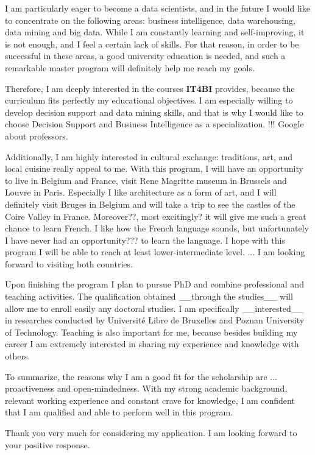 \documentclass[a4paper,14pt]{extarticle}
\begin{document}
I am particularly eager to become a data scientists, and in the future I would like to concentrate on the following areas: business intelligence, data warehousing, data mining and big data. While I am constantly learning and self-improving, it is not enough, and I feel a certain lack of skills. For that reason, in order to be successful in these areas, a good university education is needed, and such a remarkable master program will definitely help me reach my goals.

Therefore, I am deeply interested in the courses \textbf{IT4BI} provides, because the curriculum fits perfectly my educational objectives. I am especially willing to develop decision support and data mining skills, and that is why I would like to choose Decision Support and Business Intelligence as a specialization. !!! Google about professors.

Additionally, I am highly interested in cultural exchange: traditions, art, and local cuisine really appeal to me. With this program, I will have an opportunity to live in Belgium and France, visit Rene Magritte museum in Brussels and Louvre in Paris. Especially I like architecture as a form of art, and I will definitely visit Bruges in Belgium and will take a trip to see the castles of the Coire Valley in France. Moreover??, most excitingly? it will give me such a great chance to learn French. I like how the French language sounds, but unfortunately I have never had an opportunity??? to learn the language. I hope with this program I will be able to reach at least lower-intermediate level. ... I am looking forward to visiting both countries.

Upon finishing the program I plan to pursue PhD and combine professional and teaching activities. The qualification obtained __through the studies__ will allow me to enroll easily any doctoral studies. I am specifically __interested__ in researches conducted by Université Libre de Bruxelles and Poznan University of Technology. Teaching is also important for me, because besides building my career I am extremely interested in sharing my experience and knowledge with others.

To summarize, the reasons why I am a good fit for the scholarship are ... proactiveness and open-mindedness.
With my strong academic background, relevant working experience and constant crave for knowledge, I am confident that I am qualified and able to perform well in this program.

Thank you very much for considering my application. I am looking forward to your positive response.
\end{document}
